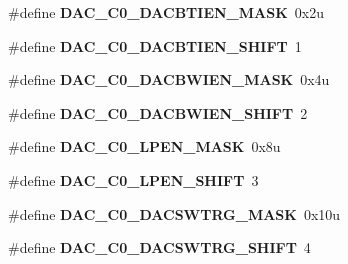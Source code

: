 \begin{DoxyCompactItemize}
\item 
\hypertarget{group___d_a_c___register___masks_gad8a60a2fa6211ff08bba4b9648fb8daa}{}\#define {\bfseries D\+A\+C\+\_\+\+C0\+\_\+\+D\+A\+C\+B\+T\+I\+E\+N\+\_\+\+M\+A\+S\+K}~0x2u\label{group___d_a_c___register___masks_gad8a60a2fa6211ff08bba4b9648fb8daa}

\item 
\hypertarget{group___d_a_c___register___masks_ga1f8eb9a96341365badba1280bed49e05}{}\#define {\bfseries D\+A\+C\+\_\+\+C0\+\_\+\+D\+A\+C\+B\+T\+I\+E\+N\+\_\+\+S\+H\+I\+F\+T}~1\label{group___d_a_c___register___masks_ga1f8eb9a96341365badba1280bed49e05}

\item 
\hypertarget{group___d_a_c___register___masks_gaedff72359a12b93e4b61a57a0613d3cb}{}\#define {\bfseries D\+A\+C\+\_\+\+C0\+\_\+\+D\+A\+C\+B\+W\+I\+E\+N\+\_\+\+M\+A\+S\+K}~0x4u\label{group___d_a_c___register___masks_gaedff72359a12b93e4b61a57a0613d3cb}

\item 
\hypertarget{group___d_a_c___register___masks_ga2b61f6fc85e9dc9d7c736055b47fadd1}{}\#define {\bfseries D\+A\+C\+\_\+\+C0\+\_\+\+D\+A\+C\+B\+W\+I\+E\+N\+\_\+\+S\+H\+I\+F\+T}~2\label{group___d_a_c___register___masks_ga2b61f6fc85e9dc9d7c736055b47fadd1}

\item 
\hypertarget{group___d_a_c___register___masks_ga54a04b9ae84c5a4f8977ae2e1a889717}{}\#define {\bfseries D\+A\+C\+\_\+\+C0\+\_\+\+L\+P\+E\+N\+\_\+\+M\+A\+S\+K}~0x8u\label{group___d_a_c___register___masks_ga54a04b9ae84c5a4f8977ae2e1a889717}

\item 
\hypertarget{group___d_a_c___register___masks_ga97aaa812a3938df3559cb40b893db431}{}\#define {\bfseries D\+A\+C\+\_\+\+C0\+\_\+\+L\+P\+E\+N\+\_\+\+S\+H\+I\+F\+T}~3\label{group___d_a_c___register___masks_ga97aaa812a3938df3559cb40b893db431}

\item 
\hypertarget{group___d_a_c___register___masks_ga7e785d90fec3c1817fc53fea41f41644}{}\#define {\bfseries D\+A\+C\+\_\+\+C0\+\_\+\+D\+A\+C\+S\+W\+T\+R\+G\+\_\+\+M\+A\+S\+K}~0x10u\label{group___d_a_c___register___masks_ga7e785d90fec3c1817fc53fea41f41644}

\item 
\hypertarget{group___d_a_c___register___masks_ga25e2afd71ee5cc41adde6f072c9d2604}{}\#define {\bfseries D\+A\+C\+\_\+\+C0\+\_\+\+D\+A\+C\+S\+W\+T\+R\+G\+\_\+\+S\+H\+I\+F\+T}~4\label{group___d_a_c___register___masks_ga25e2afd71ee5cc41adde6f072c9d2604}


\end{DoxyCompactItemize}
